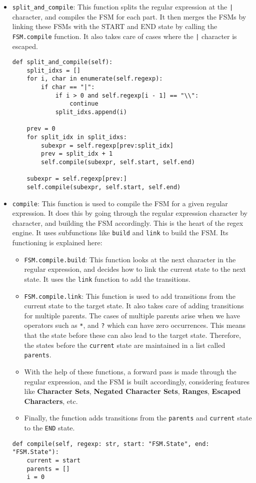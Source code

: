 \documentclass[12pt]{report}
\begin{document}
\begin{itemize}
    \item \texttt{split\_and\_compile}: This function splits the regular expression at the \texttt{|} character, and compiles the FSM for each part. It then merges the FSMs by linking these FSMs with the START and END state by calling the \texttt{FSM.compile} function. It also takes care of cases where the \texttt{|} character is escaped.
          \begin{lstlisting}[caption={\texttt{FSM.split\_and\_compile}}]
def split_and_compile(self):
    split_idxs = []
    for i, char in enumerate(self.regexp):
        if char == "|":
            if i > 0 and self.regexp[i - 1] == "\\":
                continue
            split_idxs.append(i)

    prev = 0
    for split_idx in split_idxs:
        subexpr = self.regexp[prev:split_idx]
        prev = split_idx + 1
        self.compile(subexpr, self.start, self.end)

    subexpr = self.regexp[prev:]
    self.compile(subexpr, self.start, self.end)
        \end{lstlisting}
    \item \texttt{compile}: This function is used to compile the FSM for a given regular expression. It does this by going through the regular expression character by character, and building the FSM accordingly. This is the heart of the regex engine. It uses subfunctions like \texttt{build} and \texttt{link} to build the FSM. Its functioning is explained here:
          \begin{itemize}
              \item \texttt{FSM.compile.build}: This function looks at the next character in the regular expression, and decides how to link the current state to the next state. It uses the \texttt{link} function to add the transitions.
              \item \texttt{FSM.compile.link}: This function is used to add transitions from the current state to the target state. It also takes care of adding transitions for multiple parents. The cases of multiple parents arise when we have operators such as \texttt{*}, and \texttt{?} which can have zero occurrences. This means that the state before these can also lead to the target state. Therefore, the states before the \texttt{current} state are maintained in a list called \texttt{parents}.
              \item With the help of these functions, a forward pass is made through the regular expression, and the FSM is built accordingly, considering features like \textbf{Character Sets}, \textbf{Negated Character Sets}, \textbf{Ranges}, \textbf{Escaped Characters}, etc.
              \item Finally, the function adds transitions from the \texttt{parents} and \texttt{current} state to the \texttt{END} state.
          \end{itemize}
          \begin{lstlisting}[caption={\texttt{FSM.compile}}]
def compile(self, regexp: str, start: "FSM.State", end: "FSM.State"):
    current = start
    parents = []
    i = 0


\end{lstlisting}
\end{itemize}
\end{document}
